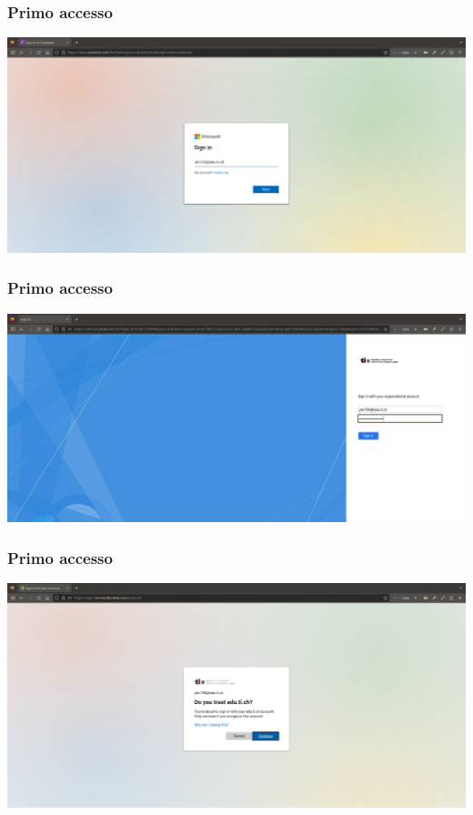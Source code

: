 \documentclass{beamer}
\begin{document}
\begin{frame}
  \frametitle{Primo accesso}
  \begin{center}
    \includegraphics[width=0.8\linewidth]{images/2.png}
  \end{center}
\end{frame}

\begin{frame}
  \frametitle{Primo accesso}
  \begin{center}
    \includegraphics[width=0.8\linewidth]{images/3.png}
  \end{center}
\end{frame}

\begin{frame}
  \frametitle{Primo accesso}
  \begin{center}
    \includegraphics[width=0.8\linewidth]{images/4.png}
  \end{center}
\end{frame}
\end{document}
